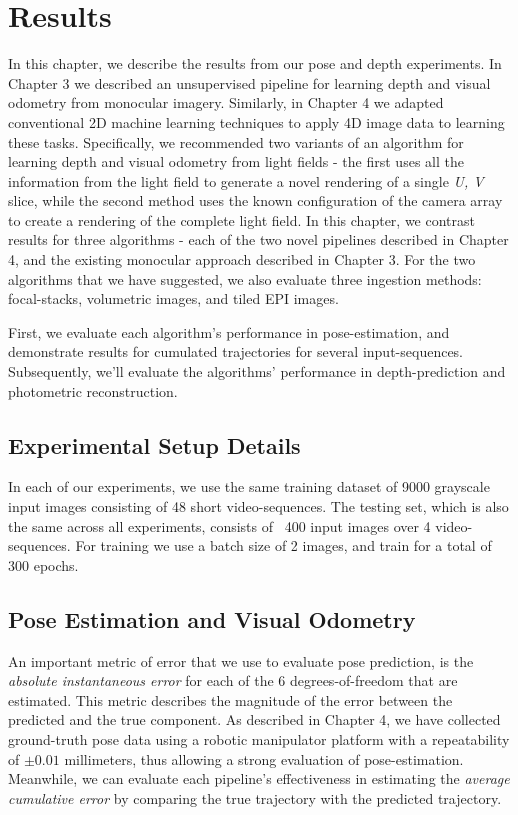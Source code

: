 

\chapter{Results}

In this chapter, we describe the results from our pose and depth experiments. In Chapter 3 we described an unsupervised pipeline for learning depth and visual odometry from monocular imagery. Similarly, in Chapter 4 we adapted conventional 2D machine learning techniques to apply 4D image data to learning these tasks. Specifically, we recommended two variants of an algorithm for learning depth and visual odometry from light fields - the first uses all the information from the light field to generate a novel rendering of a single \textit{U, V} slice, while the second method uses the known configuration of the camera array to create a rendering of the complete light field. In this chapter, we contrast results for three algorithms - each of the two novel pipelines described in Chapter 4, and the existing monocular approach described in Chapter 3. For the two algorithms that we have suggested, we also evaluate three ingestion methods: focal-stacks, volumetric images, and tiled EPI images. 

First, we evaluate each algorithm's performance in pose-estimation, and demonstrate results for cumulated trajectories for several input-sequences. Subsequently, we'll evaluate the algorithms' performance in depth-prediction and photometric reconstruction. 


\section{Experimental Setup Details}
In each of our experiments, we use the same training dataset of 9000 grayscale input images consisting of 48 short video-sequences. The testing set, which is also the same across all experiments, consists of ~400 input images over 4 video-sequences. For training we use a batch size of 2 images, and train for a total of 300 epochs. 


\section{Pose Estimation and Visual Odometry}

An important metric of error that we use to evaluate pose prediction, is the \textit{absolute instantaneous error} for each of the 6 degrees-of-freedom that are estimated. This metric describes the magnitude of the error between the predicted and the true component. As described in Chapter 4, we have collected ground-truth pose data using a robotic manipulator platform with a repeatability of $\pm 0.01$ millimeters, thus allowing a strong evaluation of pose-estimation. Meanwhile, we can evaluate each pipeline's effectiveness in estimating the \textit{average cumulative error} by comparing the true trajectory with the predicted trajectory. 


